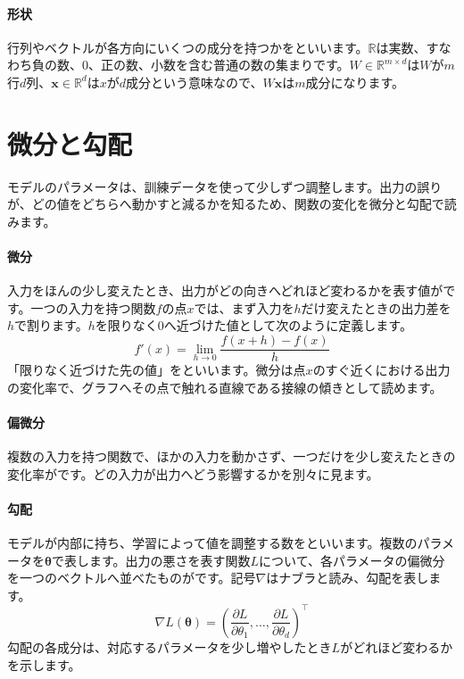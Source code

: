 \paragraph{形状}
        行列やベクトルが各方向にいくつの成分を持つかをといいます。$\mathbb{R}$は実数、すなわち負の数、0、正の数、小数を含む普通の数の集まりです。$W\in\mathbb{R}^{m\times d}$は$W$が$m$行$d$列、$\mathbf{x}\in\mathbb{R}^{d}$は$x$が$d$成分という意味なので、$W\mathbf{x}$は$m$成分になります。

\par
\endgroup
\par
\endgroup


\section{微分と勾配}
\label{sec:06-machine-learning-02}

モデルのパラメータは、訓練データを使って少しずつ調整します。出力の誤りが、どの値をどちらへ動かすと減るかを知るため、関数の変化を微分と勾配で読みます。

\begingroup
\begingroup
\paragraph{微分}
        入力をほんの少し変えたとき、出力がどの向きへどれほど変わるかを表す値がです。一つの入力を持つ関数$f$の点$x$では、まず入力を$h$だけ変えたときの出力差を$h$で割ります。$h$を限りなく0へ近づけた値として次のように定義します。
        \[
          f'(x)=\lim_{h\to0}\frac{f(x+h)-f(x)}{h}
        \]
        「限りなく近づけた先の値」をといいます。微分は点$x$のすぐ近くにおける出力の変化率で、グラフへその点で触れる直線である接線の傾きとして読めます。

\paragraph{偏微分}
        複数の入力を持つ関数で、ほかの入力を動かさず、一つだけを少し変えたときの変化率がです。どの入力が出力へどう影響するかを別々に見ます。

\par
\endgroup
\medskip
\begingroup
\paragraph{勾配}
        モデルが内部に持ち、学習によって値を調整する数をといいます。複数のパラメータを$\boldsymbol{\theta}$で表します。出力の悪さを表す関数$L$について、各パラメータの偏微分を一つのベクトルへ並べたものがです。記号$\nabla$はナブラと読み、勾配を表します。
        \[
          \nabla L(\boldsymbol{\theta})=
          \left(
          \frac{\partial L}{\partial\theta_1},\ldots,
          \frac{\partial L}{\partial\theta_d}
          \right)^\top
        \]
        勾配の各成分は、対応するパラメータを少し増やしたとき$L$がどれほど変わるかを示します。

